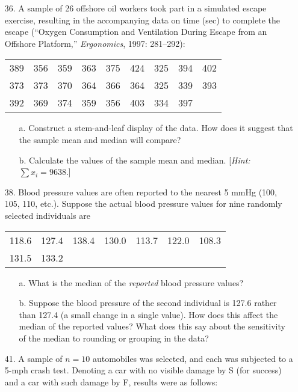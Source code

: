\documentclass[letterpaper,12pt]{article}
\begin{document}
\begin{enumerate}
\begin{enumerate}
    \end{enumerate}
  \item[36.]
    A sample of 26 offshore oil workers took part in a simulated escape exercise, resulting in the accompanying data on time (sec) to complete the escape (``Oxygen Consumption and Ventilation During Escape from an Offshore Platform,'' \textit{Ergonomics}, 1997: 281–292):
    \begin{center}
      \begin{tabular}{ccccccccc}
        389 & 356 & 359 & 363 & 375 & 424 & 325 & 394 & 402 \\
        373 & 373 & 370 & 364 & 366 & 364 & 325 & 339 & 393 \\
        392 & 369 & 374 & 359 & 356 & 403 & 334 & 397
      \end{tabular}
    \end{center}
    \begin{enumerate}
      \item[a.]
        Construct a stem-and-leaf display of the data. How does it suggest that the sample mean and median will compare?
      \item[b.]
        Calculate the values of the sample mean and median. [\textit{Hint:} $\sum{x_i} = 9638$.]
    \end{enumerate}
  \item[38.]
    Blood pressure values are often reported to the nearest 5 mmHg (100, 105, 110, etc.). Suppose the actual blood pressure values for nine randomly selected individuals are
    \begin{center}
      \begin{tabular}{ccccccc}
        118.6 & 127.4 & 138.4 & 130.0 & 113.7 & 122.0 & 108.3 \\
        131.5 & 133.2
      \end{tabular}
    \end{center}
    \begin{enumerate}
      \item[a.]
        What is the median of the \textit{reported} blood pressure values?
      \item[b.]
        Suppose the blood pressure of the second individual is 127.6 rather than 127.4 (a small change in a single value). How does this affect the median of the reported values? What does this say about the sensitivity of the median to rounding or grouping in the data?
    \end{enumerate}
  \item[41.]
    A sample of $n = 10$ automobiles was selected, and each was subjected to a 5-mph crash test. Denoting a car with no visible damage by S (for success) and a car with such damage by F, results were as follows:

\end{enumerate}
\end{document}
